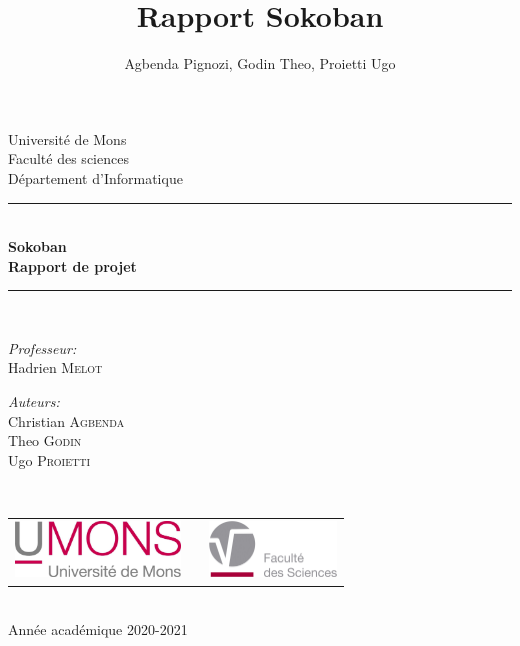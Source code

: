 \documentclass{article}
\title{Rapport Sokoban}
\author{Agbenda Pignozi, Godin Theo, Proietti Ugo}
\date{ }
\begin{document}
\begin{titlepage}
    \begin{center}
        
        {\Large Université de Mons}\\[1ex]
        {\Large Faculté des sciences}\\[1ex]
        {\Large Département d'Informatique}\\[2.5cm]
        
        \newcommand{\HRule}{\rule{\linewidth}{0.3mm}}
        \HRule \\[0.3cm]
        { \LARGE \bfseries Sokoban \\[0.3cm]}
        { \LARGE \bfseries Rapport de projet \\[0.1cm]} %
        \HRule \\[1.5cm]
        
        \begin{minipage}[t]{0.45\textwidth}
            \begin{flushleft} \large
                \emph{Professeur:}\\
                Hadrien \textsc{Melot}\\
            \end{flushleft}
        \end{minipage}
        \begin{minipage}[t]{0.45\textwidth}
            \begin{flushright} \large
                \emph{Auteurs:} \\
                Christian \textsc{Agbenda} \\
                Theo \textsc{Godin} \\
                Ugo \textsc{Proietti}
            \end{flushright}
        \end{minipage}\\[2ex]
        
        \vfill
        
        \begin{center}
            \begin{tabular}[t]{c c c}
                \includegraphics[height=1.5cm]{logoumons.jpg} &
                \hspace{0.3cm} &
                \includegraphics[height=1.5cm]{logofs.jpg}
            \end{tabular}
        \end{center}~\\
        
        {\large Année académique 2020-2021}
        
    \end{center}
\end{titlepage}
\end{document}

